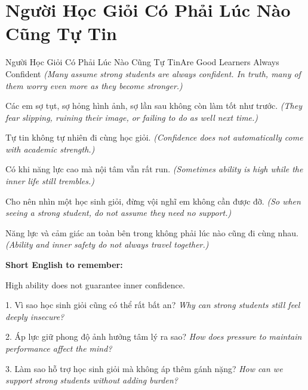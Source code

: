 \section{Người Học Giỏi Có Phải Lúc Nào Cũng Tự Tin}
\begin{truyen}{Người Học Giỏi Có Phải Lúc Nào Cũng Tự Tin}{Are Good Learners Always Confident}
\textit{(Many assume strong students are always confident. In truth, many of them worry even more as they become stronger.)}

Các em sợ tụt, sợ hỏng hình ảnh, sợ lần sau không còn làm tốt như trước.
\textit{(They fear slipping, ruining their image, or failing to do as well next time.)}

Tự tin không tự nhiên đi cùng học giỏi.
\textit{(Confidence does not automatically come with academic strength.)}

Có khi năng lực cao mà nội tâm vẫn rất run.
\textit{(Sometimes ability is high while the inner life still trembles.)}

Cho nên nhìn một học sinh giỏi, đừng vội nghĩ em không cần được đỡ.
\textit{(So when seeing a strong student, do not assume they need no support.)}
\end{truyen}

\begin{baihoc}
Năng lực và cảm giác an toàn bên trong không phải lúc nào cũng đi cùng nhau.
\textit{(Ability and inner safety do not always travel together.)}
\end{baihoc}

\begin{ghinhoanh}
\textbf{Short English to remember:}

High ability does not guarantee inner confidence.

\end{ghinhoanh}

\begin{tuhocnhanh}
1. Vì sao học sinh giỏi cũng có thể rất bất an? \textit{Why can strong students still feel deeply insecure?}

2. Áp lực giữ phong độ ảnh hưởng tâm lý ra sao? \textit{How does pressure to maintain performance affect the mind?}

3. Làm sao hỗ trợ học sinh giỏi mà không áp thêm gánh nặng? \textit{How can we support strong students without adding burden?}
\end{tuhocnhanh}
\ngancach


